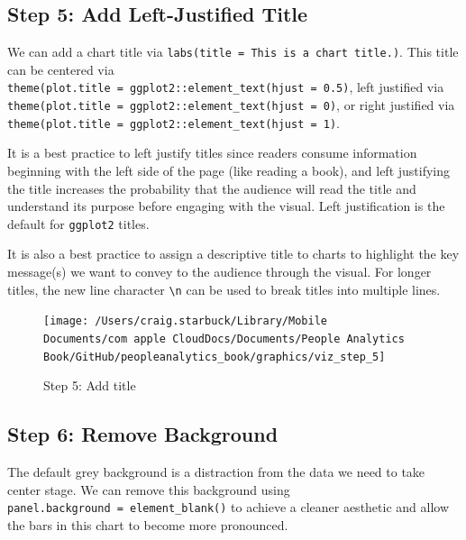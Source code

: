 \documentclass[
]{book}
\begin{document}
\hypertarget{step-5-add-left-justified-title}{%
\subsection{Step 5: Add Left-Justified Title}\label{step-5-add-left-justified-title}}

We can add a chart title via \texttt{labs(title\ =\ \textquotesingle{}This\ is\ a\ chart\ title.\textquotesingle{})}. This title can be centered via \texttt{theme(plot.title\ =\ ggplot2::element\_text(hjust\ =\ 0.5)}, left justified via \texttt{theme(plot.title\ =\ ggplot2::element\_text(hjust\ =\ 0)}, or right justified via \texttt{theme(plot.title\ =\ ggplot2::element\_text(hjust\ =\ 1)}.

It is a best practice to left justify titles since readers consume information beginning with the left side of the page (like reading a book), and left justifying the title increases the probability that the audience will read the title and understand its purpose before engaging with the visual. Left justification is the default for \texttt{ggplot2} titles.

It is also a best practice to assign a descriptive title to charts to highlight the key message(s) we want to convey to the audience through the visual. For longer titles, the new line character \texttt{\textbackslash{}n} can be used to break titles into multiple lines.

\begin{figure}

{\centering \texttt{[image: /Users/craig.starbuck/Library/Mobile Documents/com~apple~CloudDocs/Documents/People Analytics Book/GitHub/peopleanalytics\_book/graphics/viz\_step\_5]} 

}

\caption{Step 5: Add title}\label{fig:barchart-5}
\end{figure}

\hypertarget{step-6-remove-background}{%
\subsection{Step 6: Remove Background}\label{step-6-remove-background}}

The default grey background is a distraction from the data we need to take center stage. We can remove this background using \texttt{panel.background\ =\ element\_blank()} to achieve a cleaner aesthetic and allow the bars in this chart to become more pronounced.
\end{document}
